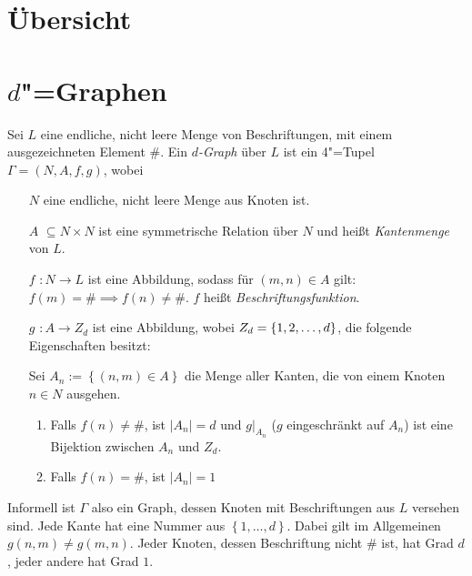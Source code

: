 \documentclass[11pt]{article}
\newcommand{\defWord}[1]{\emph{#1}}
\begin{document}
\clearpage


\section{Übersicht}

\section{$d$"=Graphen}
\begin{definition}[$d$=Graph]
Sei $L$ eine endliche, nicht leere Menge von Beschriftungen, mit einem ausgezeichneten Element $\#$. 
Ein \defWord{$d$-Graph} über $L$ ist ein 4"=Tupel $\Gamma = \left(N, A, f, g\right)$, wobei
\begin{itemize}
	\item[$N$] eine endliche, nicht leere Menge aus Knoten ist.
	\item[$A$] $\subseteq N \times N$ ist eine symmetrische Relation über $N$ und heißt \defWord{Kantenmenge} von $L$.
	\item[$f$] $: N \rightarrow L$ ist eine Abbildung, sodass für $\left(m, n\right) \in A$ gilt: $f\left(m\right) = \# \implies f\left(n\right) \neq \#$. $f$  heißt \defWord{Beschriftungsfunktion}.
	\item[$g$] $: A \rightarrow Z_d$ ist eine Abbildung, wobei $Z_d = \left \{1, 2,\text{\dots}, d \right \}$, die folgende Eigenschaften besitzt:
	
	Sei $A_n := \left \{\left(n, m\right) \in A\right \}$ die Menge aller Kanten, die von einem Knoten $n \in N$ ausgehen.
	\begin{enumerate}
		\item Falls $f\left(n\right) \neq \#$, ist $\left|A_n\right| = d$ und $g \vert_{A_n}$ ($g$ eingeschränkt auf $A_n$) ist eine Bijektion zwischen $A_n$ und $Z_d$.
		\item Falls $f\left(n\right) = \#$, ist $\left|A_n\right| = 1$
	\end{enumerate}
	
\end{itemize}
\end{definition}

Informell ist $\Gamma$ also ein Graph, dessen Knoten mit Beschriftungen aus $L$ versehen sind. 
Jede Kante hat eine Nummer aus $\left\{1, \dots, d\right\}$. 
Dabei gilt im Allgemeinen $g\left(n, m\right) \neq g\left(m, n\right)$. 
Jeder Knoten, dessen Beschriftung nicht $\#$ ist, hat Grad $d$, jeder andere hat Grad $1$. 
\end{document}

